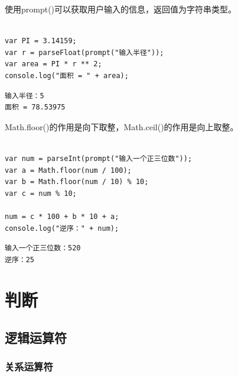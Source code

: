 使用prompt()可以获取用户输入的信息，返回值为字符串类型。 \\

 \\

\begin{lstlisting}[style=htmlcssjs]
var PI = 3.14159;
var r = parseFloat(prompt("输入半径"));
var area = PI * r ** 2;
console.log("面积 = " + area);
\end{lstlisting}

\begin{tcolorbox}
	\begin{verbatim}
输入半径：5
面积 = 78.53975
	\end{verbatim}
\end{tcolorbox}

Math.floor()的作用是向下取整，Math.ceil()的作用是向上取整。 \\

 \\

\begin{lstlisting}[style=htmlcssjs]
var num = parseInt(prompt("输入一个正三位数"));
var a = Math.floor(num / 100);
var b = Math.floor(num / 10) % 10;
var c = num % 10;

num = c * 100 + b * 10 + a;
console.log("逆序：" + num);
\end{lstlisting}

\begin{tcolorbox}
	\begin{verbatim}
输入一个正三位数：520
逆序：25
	\end{verbatim}
\end{tcolorbox}

\newpage

\chapter{判断}

\section{逻辑运算符}

\subsection{关系运算符}

